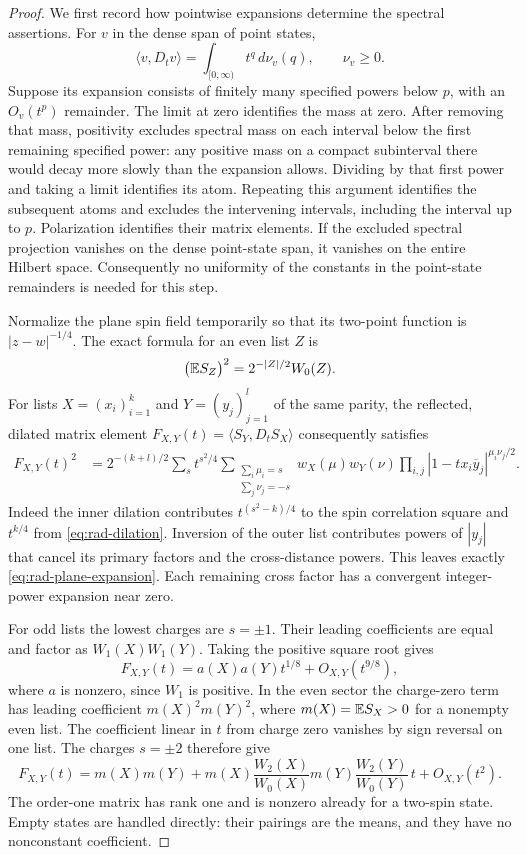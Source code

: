 \begin{proof}
We first record how pointwise expansions determine the spectral
assertions.  For $v$ in the dense span of point states,
\[
       \langle v,D_tv\rangle
             =\int_{[0,\infty)}t^q\,d\nu_v(q),
       \qquad \nu_v\geq0.
\]
Suppose its expansion consists of finitely many specified powers
below $p$, with an $O_v(t^p)$ remainder.  The limit at zero identifies
the mass at zero.  After removing that mass, positivity excludes
spectral mass on each interval below the first remaining specified
power: any positive mass on a compact subinterval there would decay
more slowly than the expansion allows.  Dividing by that first power
and taking a limit identifies its atom.  Repeating this argument
identifies the subsequent atoms and excludes the intervening
intervals, including the interval up to $p$.  Polarization identifies
their matrix elements.  If the excluded spectral projection vanishes
on the dense point-state span, it vanishes on the entire Hilbert
space.  Consequently no uniformity of the constants in the
point-state remainders is needed for this step.

Normalize the plane spin field temporarily so that its two-point
function is $|z-w|^{-1/4}$.  The exact formula for an even list $Z$ is
\[
         \bigl(\mathbb E S_Z\bigr)^2=2^{-|Z|/2}W_0(Z).
\]
For lists $X=(x_i)_{i=1}^k$ and $Y=(y_j)_{j=1}^l$ of the same
parity, the reflected, dilated matrix element
$F_{X,Y}(t)=\langle S_Y,D_tS_X\rangle$ consequently satisfies
\begin{align}
 F_{X,Y}(t)^2
 &=2^{-(k+l)/2}\sum_s t^{s^2/4}
   \sum_{\substack{\sum_i\mu_i=s\\\sum_j\nu_j=-s}}
       w_X(\mu)w_Y(\nu)
       \prod_{i,j}|1-tx_i\overline y_j|^{\mu_i\nu_j/2}.
 \label{eq:rad-plane-expansion}
\end{align}
Indeed the inner dilation contributes $t^{(s^2-k)/4}$ to the spin
correlation square and $t^{k/4}$ from \eqref{eq:rad-dilation}.
Inversion of the outer list contributes powers of $|y_j|$ that
cancel its primary factors and the cross-distance powers.  This
leaves exactly \eqref{eq:rad-plane-expansion}.  Each remaining cross
factor has a convergent integer-power expansion near zero.

For odd lists the lowest charges are $s=\pm1$.  Their leading
coefficients are equal and factor as $W_1(X)W_1(Y)$.  Taking the
positive square root gives
\[
 F_{X,Y}(t)=a(X)a(Y)t^{1/8}+O_{X,Y}(t^{9/8}),
\]
where $a$ is nonzero, since $W_1$ is positive.  In the even sector
the charge-zero term has leading coefficient
$m(X)^2m(Y)^2$, where $m(X)=\mathbb E S_X>0$ for a nonempty even list.
The coefficient linear in $t$ from charge zero vanishes by sign
reversal on one list.  The charges $s=\pm2$ therefore give
\begin{equation}
 F_{X,Y}(t)
  =m(X)m(Y)+m(X)\frac{W_2(X)}{W_0(X)}
                  m(Y)\frac{W_2(Y)}{W_0(Y)}\,t
      +O_{X,Y}(t^2).
 \label{eq:rad-even-expansion}
\end{equation}
The order-one matrix has rank one and is nonzero already for a
two-spin state.  Empty states are handled directly: their pairings
are the means, and they have no nonconstant coefficient.


\end{proof}
